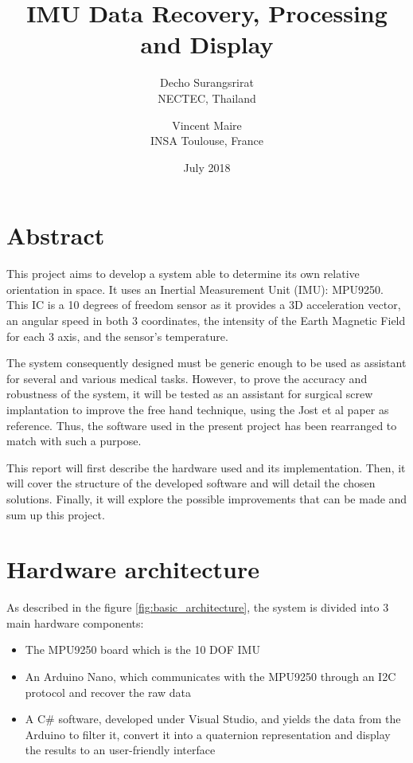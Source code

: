 \documentclass{article}
\title{IMU Data Recovery, Processing and Display}
\author{ Decho Surangsrirat \\
         NECTEC, Thailand 
         \and 
         Vincent Maire\\
         INSA Toulouse, France }
\date{July 2018}
\begin{document}
\maketitle


\section{Abstract}

This project aims to develop a system able to determine its own relative orientation in space. It uses an Inertial Measurement Unit (IMU): MPU9250. This IC is a 10 degrees of freedom sensor as it provides a 3D acceleration vector, an angular speed in both 3 coordinates, the intensity of the Earth Magnetic Field for each 3 axis, and the sensor's temperature. 

The system consequently designed must be generic enough to be used as assistant for several and various medical tasks. However, to prove the accuracy and robustness of the system, it will be tested as an assistant for surgical screw implantation to improve the free hand technique, using the Jost et al paper \cite{jost} as reference. Thus, the software used in the present project has been rearranged to match with such a purpose. 

This report will first describe the hardware used and its implementation. Then, it will cover the structure of the developed software and will detail the chosen solutions. Finally, it will explore the possible improvements that can be made and sum up this project.


\section{Hardware architecture}

As described in the figure \ref{fig:basic_architecture}, the system is divided into 3 main hardware components:
\begin{itemize}
    \item The MPU9250 board which is the 10 DOF IMU
    \item An Arduino Nano, which communicates with the MPU9250 through an I2C protocol and recover the raw data
    \item A C\# software, developed under Visual Studio, and yields the data from the Arduino to filter it, convert it into a quaternion representation and display the results to an user-friendly interface 
\end{itemize} 
\end{document}
